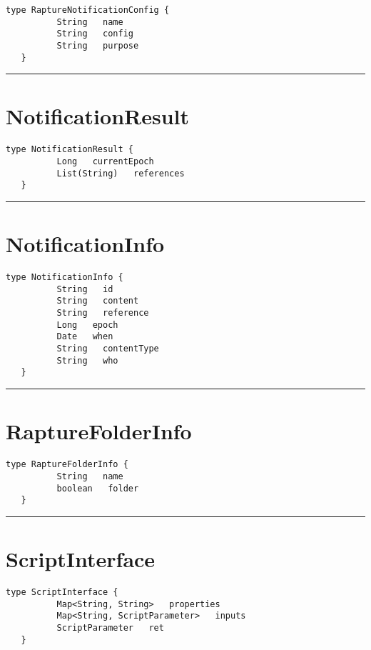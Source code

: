 \begin{lstlisting}[style=nonumbers]
   type RaptureNotificationConfig {
          String   name
          String   config
          String   purpose
   }
\end{lstlisting}

\rule{12cm}{2pt}
\section{NotificationResult}
\label{type:NotificationResult}

\begin{lstlisting}[style=nonumbers]
   type NotificationResult {
          Long   currentEpoch
          List(String)   references
   }
\end{lstlisting}

\rule{12cm}{2pt}
\section{NotificationInfo}
\label{type:NotificationInfo}

\begin{lstlisting}[style=nonumbers]
   type NotificationInfo {
          String   id
          String   content
          String   reference
          Long   epoch
          Date   when
          String   contentType
          String   who
   }
\end{lstlisting}

\rule{12cm}{2pt}
\section{RaptureFolderInfo}
\label{type:RaptureFolderInfo}

\begin{lstlisting}[style=nonumbers]
   type RaptureFolderInfo {
          String   name
          boolean   folder
   }
\end{lstlisting}

\rule{12cm}{2pt}
\section{ScriptInterface}
\label{type:ScriptInterface}

\begin{lstlisting}[style=nonumbers]
   type ScriptInterface {
          Map<String, String>   properties
          Map<String, ScriptParameter>   inputs
          ScriptParameter   ret
   }
\end{lstlisting}

